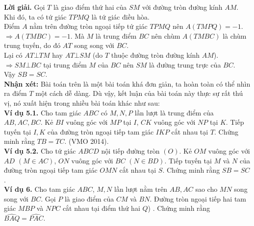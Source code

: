 \documentclass[12pt,a4paper]{article}
\begin{document}
\textbf{Lời giải.} Gọi \(T\) là giao điểm thứ hai của \(SM\) với đường tròn đường kính \(AM\). Khi đó, ta có tứ giác \(TPMQ\) là tứ giác điều hòa.\\
Điểm \(A\) nằm trên đường tròn ngoại tiếp tứ giác \(TPMQ\) nên \(A\left( {TMPQ} \right) =  - 1.\)\\
\( \Rightarrow A\left( {TMBC} \right) =  - 1\).
Mà \(M\) là trung điểm \(BC\) nên chùm \(A\left( {TMBC} \right)\) là chùm trung tuyến, do đó \(AT\) song song với \(BC\).\\
Lại có \(AT \bot TM\) hay \(AT \bot SM\) (do \(T\) thuộc đường tròn đường kính \(AM\)).\\
\( \Rightarrow SM \bot BC\) tại trung điểm \(M\) của \(BC\) nên \(SM\) là đường trung trực của \(BC\).\\
Vậy \(SB = SC\).\\
\textbf{Nhận xét:} Bài toán trên là một bài toán khá đơn giản, ta hoàn toàn có thể nhìn ra điểm \(T\) một cách dễ dàng. Dù vậy, kết luận của bài toán này thực sự rất thú vị, nó xuất hiện trong nhiều bài toán khác như sau:\\
\textbf{Ví dụ 5.1.} Cho tam giác \(ABC\) có \(M, N, P\) lần lượt là trung điểm của \(AB, AC, BC\). Kẻ \(BI\) vuông góc với \(MP\) tại \(I\), \(CK\) vuông góc với \(NP\) tại \(K\). Tiếp tuyến tại \(I, K\) của đường tròn ngoại tiếp tam giác \(IKP\) cắt nhau tại \(T\). Chứng minh rằng \(TB = TC\). (VMO 2014).\\
\textbf{Ví dụ 5.2.} Cho tứ giác \(ABCD\) nội tiếp đường tròn \(\left( O \right)\). Kẻ \(OM\) vuông góc với \(AD\) \(\left( {M \in AC} \right)\), \(ON\) vuông góc với \(BC\) \(\left( {N \in BD} \right).\) Tiếp tuyến tại \(M\) và \(N\) của đường tròn ngoại tiếp tam giác \(OMN\) cắt nhau tại \(S\). Chứng minh rằng \(SB = SC\).\\
\newpage
\textbf{Ví dụ 6.} Cho tam giác \(ABC\), \(M, N\) lần lượt nằm trên \(AB, AC\) sao cho \(MN\) song song với \(BC\). Gọi \(P\) là giao điểm của \(CM\) và \(BN\). Đường tròn ngoại tiếp hai tam giác \(MBP\) và \(NPC\) cắt nhau tại điểm thứ hai \(Q\)) . Chứng minh rằng \(\widehat {BAQ} = \widehat {PAC}.\)
\end{document}
